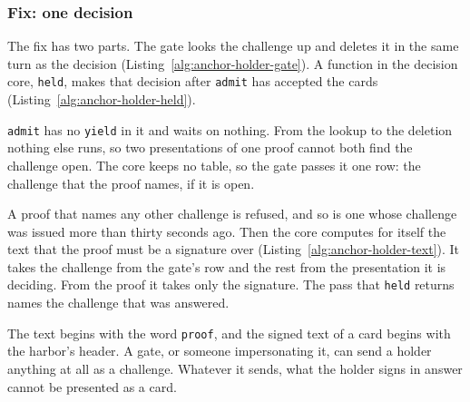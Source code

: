 \subsubsection{Fix: one decision}

The fix has two parts. The gate looks the challenge up and deletes it in
the same turn as the decision (Listing~\ref{alg:anchor-holder-gate}). A
function in the decision core, \texttt{held}, makes that decision after
\texttt{admit} has accepted the cards
(Listing~\ref{alg:anchor-holder-held}).


\texttt{admit} has no \texttt{yield} in it and waits on nothing. From the
lookup to the deletion nothing else runs, so two presentations of one proof
cannot both find the challenge open. The core keeps no table, so the gate
passes it one row: the challenge that the proof names, if it is open.


A proof that names any other challenge is refused, and so is one whose
challenge was issued more than thirty seconds ago. Then the core computes
for itself the text that the proof must be a signature over
(Listing~\ref{alg:anchor-holder-text}). It takes the challenge from the
gate's row and the rest from the presentation it is deciding. From the proof
it takes only the signature. The pass that \texttt{held} returns names the
challenge that was answered.


The text begins with the word \texttt{proof}, and the signed text of a
card begins with the harbor's header. A gate, or someone impersonating it,
can send a holder anything at all as a challenge. Whatever it sends, what
the holder signs in answer cannot be presented as a card.

\pagebreak[0]

